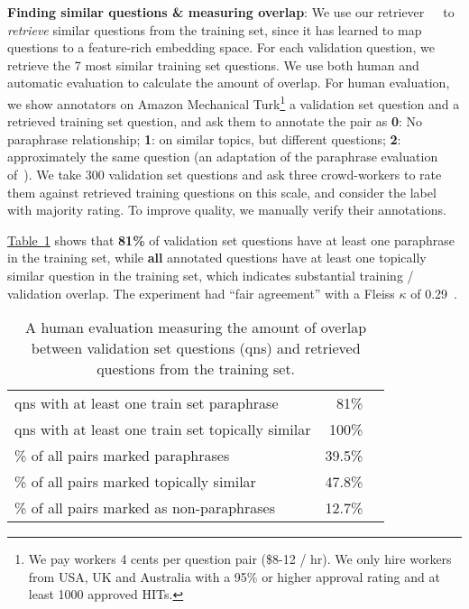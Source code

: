\documentclass[11pt]{article}
\newcommand{\namedref}[2]{\hyperref[#2]{#1~\ref*{#2}}}
\newcommand{\tableref}[1]{\namedref{Table}{#1}}
\newcommand{\retriever}[1]{\textsc{c-REALM}}
\begin{document}
\noindent \textbf{Finding similar questions \& measuring overlap}: We use our retriever~\retriever~~to \emph{retrieve} similar questions from the training set, since it has learned to map questions to a feature-rich embedding space. For each validation question, we retrieve the 7 most similar training set questions. We use both human and automatic evaluation to calculate the amount of overlap. For human evaluation, we show annotators on Amazon Mechanical Turk\footnote{We pay workers 4 cents per question pair (\$8-12 / hr). We only hire workers
from USA, UK and Australia with a 95\% or higher approval rating and at least 1000 approved HITs.} a validation set question and a retrieved training set question, and ask them to annotate the pair as \textbf{0}: No paraphrase relationship; \textbf{1}: on similar topics, but different questions; \textbf{2}: approximately the same question (an adaptation of the paraphrase evaluation of~\citealp{kok2010hitting}). We take 300 validation set questions and ask three crowd-workers to rate them against retrieved training questions on this scale, and consider the label with majority rating. To improve quality, we manually verify their annotations. 

\tableref{tab:human_qa_overlap} shows that \textbf{81\%} of validation set questions have at least one paraphrase in the training set, while \textbf{all} annotated questions have at least one topically similar question in the training set, which indicates substantial training / validation overlap. The experiment had ``fair agreement'' with a Fleiss $\kappa$ of 0.29~\citep{fleiss1971measuring, landis1977measurement}.

\begin{table}[t]
\small
\begin{center}
\begin{tabular}{ lrr } 
 \toprule
qns with at least one train set paraphrase & 81\% \\
qns with at least one train set topically similar & 100\% \\
\midrule
\% of all pairs marked paraphrases & 39.5\% \\
\% of all pairs marked topically similar & 47.8\% \\
\% of all pairs marked as non-paraphrases & 12.7\% \\
\bottomrule
\end{tabular}
\end{center}
\vspace{-0.1in}
\caption{A human evaluation measuring the amount of overlap between validation set questions (qns) and retrieved questions from the training set.}
\vspace{-0.1in}
\label{tab:human_qa_overlap}
\end{table}
\end{document}
